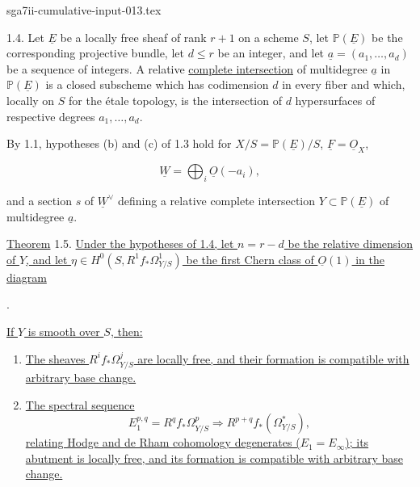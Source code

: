 \begin{filecontents*}{sga7ii-cumulative-input-013.tex}

1.4. Let $\underline E$ be a locally free sheaf of rank $r+1$ on a scheme
$S$, let $\mathbb P(\underline E)$ be the corresponding projective bundle,
let $d\leq r$ be an integer, and let
$\underline a=(a_1,\ldots,a_d)$ be a sequence of integers.  A relative
\underline{complete intersection} of multidegree $\underline a$ in
$\mathbb P(\underline E)$ is a closed subscheme which has codimension $d$
in every fiber and which, locally on $S$ for the étale topology, is the
intersection of $d$ hypersurfaces of respective degrees
$a_1,\ldots,a_d$.

By 1.1, hypotheses (b) and (c) of 1.3 hold for
$X/S=\mathbb P(\underline E)/S$, $\underline F=\underline O_X$,

\begin{equation*}
\underline W=\bigoplus_i\underline O(-a_i),
\end{equation*}

and a section $s$ of $\underline W^\vee$ defining a relative complete
intersection $Y\subset\mathbb P(\underline E)$ of multidegree
$\underline a$.

\underline{Theorem} 1.5. \underline{Under the hypotheses of 1.4, let
$n=r-d$ be the relative dimension of $Y$, and let
$\eta\in H^0(S,R^1f_*\Omega^1_{Y/S})$ be the first Chern class of
$\underline O(1)$ in the diagram}

\begin{center}
\qquad .
\end{center}

\underline{If $Y$ is smooth over $S$, then:}

\begin{enumerate}[label=(\roman*),leftmargin=2.6em]
\item \underline{The sheaves $R^if_*\Omega^j_{Y/S}$ are locally free,
and their formation is compatible with arbitrary base change.}

\item \underline{The spectral sequence}
\begin{equation*}
E_1^{p,q}=R^qf_*\Omega^p_{Y/S}\Longrightarrow
R^{p+q}f_*(\Omega^*_{Y/S}),
\end{equation*}
\underline{relating Hodge and de Rham cohomology degenerates
($E_1=E_\infty$); its abutment is locally free, and its formation is
compatible with arbitrary base change.}
\end{enumerate}


\end{filecontents*}
